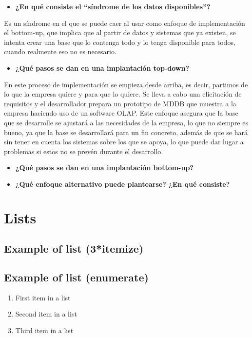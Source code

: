 \documentclass[paper=a4, fontsize=11pt]{scrartcl} %
\begin{document}
\begin{itemize}
\item \textbf{ ¿En qué consiste el ``síndrome de los datos disponibles''?}
\end{itemize}
Es un síndrome en el que se puede caer al usar como enfoque de implementación el bottom-up, que implica que al partir de datos y sistemas que ya existen, se intenta crear una base que lo contenga todo y lo tenga disponible para todos, cuando realmente eso no es necesario.

\begin{itemize}
\item \textbf{ ¿Qué pasos se dan en una implantación top-down?}
\end{itemize}
En este proceso de implementación se empieza desde arriba, es decir, partimos de lo que la empresa quiere y para que lo quiere. Se lleva a cabo una elicitación de requisitos y el desarrollador prepara un prototipo de MDDB que muestra a la empresa haciendo uso de un software OLAP. Este enfoque asegura que la base que se desarrolle se ajustará a las necesidades de la empresa, lo que no siempre es bueno, ya que la base se desarrollará para un fin concreto, además de que se hará sin tener en cuenta los sistemas sobre los que se apoya, lo que puede dar lugar a problemas si estos no se prevén durante el desarrollo. 

\begin{itemize}
\item \textbf{ ¿Qué pasos se dan en una implantación bottom-up?}
\end{itemize}


\begin{itemize}
\item \textbf{¿Qué enfoque alternativo puede plantearse? ¿En qué consiste?}
\end{itemize}





\section{Lists}


\subsection{Example of list (3*itemize)}


\subsection{Example of list (enumerate)}
\begin{enumerate}
\item First item in a list 
\item Second item in a list 
\item Third item in a list
\end{enumerate}

\end{document}
